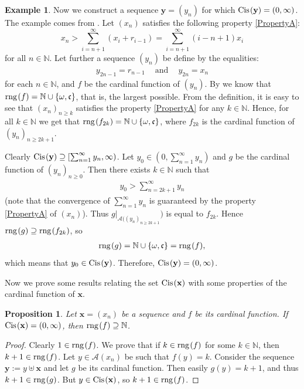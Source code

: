 \documentclass{amsart}
\newtheorem{proposition}[theorem]{Proposition}
\theoremstyle{definition}
\newtheorem{example}[theorem]{Example}
\newcommand{\A}{\mathcal A}
\newcommand{\rng}{{\rm rng} \hspace{0.03cm}}
\newcommand{\Cis}{{\rm Cis} \hspace{0.03cm}}
\begin{document}
\begin{example}\label{ExampleFixMax3}
Now we construct a sequence $\mathbf{y}=(y_n)$ for which $\Cis (\textbf{y})=(0,\infty)$. The example comes from \cite{cardfun}. Let $(x_n)$ satisfies the following property \eqref{PropertyA}: 
\begin{equation}\label{PropertyA}
x_n>\sum_{i=n+1}^{\infty} (x_i+r_{i-1}) = \sum_{i=n+1}^{\infty} (i-n+1)x_{i} \tag{A}
\end{equation}
for all $n\in\mathbb{N}$. Let further a sequence $(y_{n})$ be define by the equalities:
\begin{align*}
y_{2n-1} = r_{n-1} \ \ \ \ \textrm{ and } \ \ \ \ y_{2n} = x_{n}
\end{align*}
for each $n\in\mathbb{N}$, and $f$ be the cardinal function of $(y_n)$. By \cite[Theorem 2.2]{cardfun} we know that $\rng(f)=\mathbb{N}\cup\{\omega,\mathfrak{c}\}$, that is, the largest possible. From the definition, it is easy to see that $(x_n)_{n\geq k}$ satisfies the property \eqref{PropertyA} for any $k\in\mathbb{N}$. Hence, for all $k\in\mathbb{N}$ we get that $\rng(f_{2k})=\mathbb{N}\cup\{\omega,\mathfrak{c}\}$, where $f_{2k}$ is the cardinal function of $(y_n)_{n\geq 2k+1}$. 

Clearly $\Cis (\textbf{y})\supseteq [\sum_{n=1}^{\infty}y_n,\infty)$. Let $y_0\in(0,\sum_{n=1}^{\infty}{y_n})$ and $g$ be the cardinal function of $(y_n)_{n\geq 0}$. Then there exists $k\in\mathbb{N}$ such that 
\begin{align*}
y_0>\sum_{n=2k+1}^{\infty}y_{n}
\end{align*}
(note that the convergence of $\sum_{n=1}^{\infty}y_{n}$ is guaranteed by the property \eqref{PropertyA} of $(x_n)$). Thus $g\vert_{\A((y_n)_{n\geq 2k+1}})$ is equal to $f_{2k}$. Hence $\rng(g)\supseteq \rng(f_{2k})$, so
\begin{align*}
\rng(g)=\mathbb{N}\cup\{\omega,\mathfrak{c}\}=\rng(f),
\end{align*}
which means that $y_0\in \Cis (\textbf{y})$. Therefore, $\Cis (\textbf{y})=(0,\infty)$.
\end{example}


Now we prove some results relating the set $\Cis (\mathbf{x})$ with some properties of the cardinal function of $\mathbf{x}$.

\begin{proposition}\label{zawieranaturalne}
Let $\mathbf{x}=(x_{n})$ be a sequence and $f$ be its cardinal function. If $\Cis (\mathbf{x})=(0,\infty)$, then $\rng (f)\supseteq\mathbb{N}$. 
\end{proposition}
\begin{proof}
Clearly $1\in \rng (f)$. We prove that if $k\in \rng (f)$ for some $k\in\mathbb{N}$, then $k+1\in \rng (f)$. Let $y\in \mathcal{A}(x_n)$ be such that $f(y)=k$. Consider the sequence $\mathbf{y}:=y\uplus \mathbf{x}$ and let $g$ be its cardinal function. Then easily $g(y)=k+1$, and thus $k+1\in \rng(g)$. But $y\in \Cis (\textbf{x})$, so $k+1\in \rng(f)$. 
\end{proof}
\end{document}
